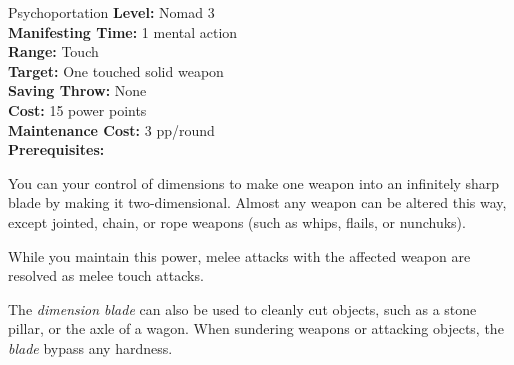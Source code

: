 {Psychoportation}
{
	\textbf{Level:}
	Nomad 3\\
	\textbf{Manifesting Time:}
	1 mental action\\
	\textbf{Range:}
	Touch\\
	\textbf{Target:}
	One touched solid weapon\\
	\textbf{Saving Throw:}
	None\\
	\textbf{Cost:}
	15 power points\\
	\textbf{Maintenance Cost:}
	3 pp/round\\
	\textbf{Prerequisites:}
	\\
}
{
	You can your control of dimensions to make one weapon into an infinitely sharp blade by making it two-dimensional. Almost any weapon can be altered this way, except jointed, chain, or rope weapons (such as whips, flails, or nunchuks).

	While you maintain this power, melee attacks with the affected weapon are resolved as melee touch attacks.

	The \emph{dimension blade} can also be used to cleanly cut objects, such as a stone pillar, or the axle of a wagon. When sundering weapons or attacking objects, the \emph{blade} bypass any hardness.
}